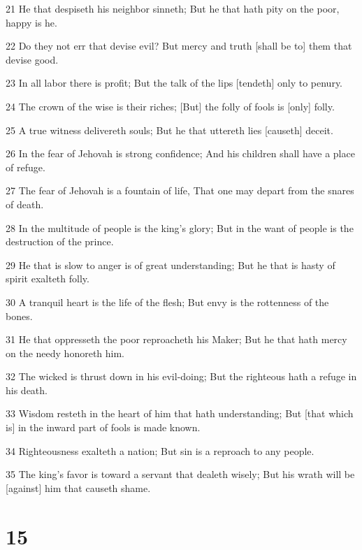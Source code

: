 \par 21 He that despiseth his neighbor sinneth; But he that hath pity on the poor, happy is he.
\par 22 Do they not err that devise evil? But mercy and truth [shall be to] them that devise good.
\par 23 In all labor there is profit; But the talk of the lips [tendeth] only to penury.
\par 24 The crown of the wise is their riches; [But] the folly of fools is [only] folly.
\par 25 A true witness delivereth souls; But he that uttereth lies [causeth] deceit.
\par 26 In the fear of Jehovah is strong confidence; And his children shall have a place of refuge.
\par 27 The fear of Jehovah is a fountain of life, That one may depart from the snares of death.
\par 28 In the multitude of people is the king's glory; But in the want of people is the destruction of the prince.
\par 29 He that is slow to anger is of great understanding; But he that is hasty of spirit exalteth folly.
\par 30 A tranquil heart is the life of the flesh; But envy is the rottenness of the bones.
\par 31 He that oppresseth the poor reproacheth his Maker; But he that hath mercy on the needy honoreth him.
\par 32 The wicked is thrust down in his evil-doing; But the righteous hath a refuge in his death.
\par 33 Wisdom resteth in the heart of him that hath understanding; But [that which is] in the inward part of fools is made known.
\par 34 Righteousness exalteth a nation; But sin is a reproach to any people.
\par 35 The king's favor is toward a servant that dealeth wisely; But his wrath will be [against] him that causeth shame.

\chapter{15}

